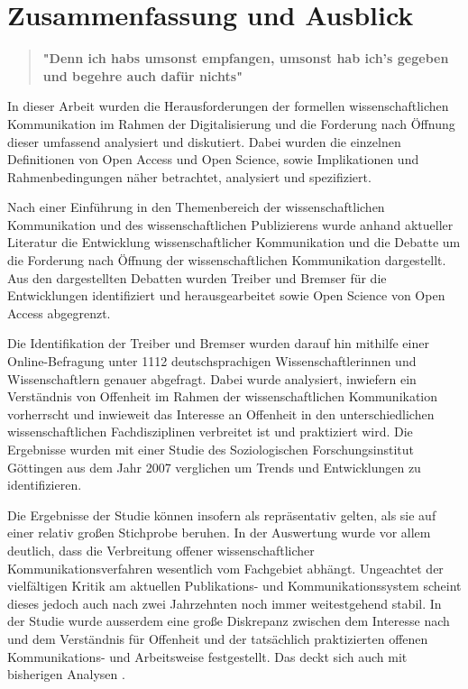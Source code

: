 \chapter{Zusammenfassung und Ausblick}

\begin{quote}
\textbf{"Denn ich habs umsonst empfangen, umsonst hab ich's gegeben und begehre auch dafür nichts"}
\end{quote} \cite{luther_1876}

In dieser Arbeit wurden die Herausforderungen der formellen wissenschaftlichen Kommunikation im Rahmen der Digitalisierung und die Forderung nach Öffnung dieser umfassend analysiert und diskutiert. Dabei wurden die einzelnen Definitionen von Open Access und Open Science, sowie Implikationen und Rahmenbedingungen näher betrachtet, analysiert und spezifiziert.

Nach einer Einführung in den Themenbereich der wissenschaftlichen Kommunikation und des wissenschaftlichen Publizierens wurde anhand aktueller Literatur die Entwicklung wissenschaftlicher Kommunikation und die Debatte um die Forderung nach Öffnung der wissenschaftlichen Kommunikation dargestellt. Aus den dargestellten Debatten wurden Treiber und Bremser für die Entwicklungen identifiziert und herausgearbeitet sowie Open Science von Open Access abgegrenzt.

Die Identifikation der Treiber und Bremser wurden darauf hin mithilfe einer Online-Befragung unter 1112 deutschsprachigen Wissenschaftlerinnen und Wissenschaftlern genauer abgefragt. Dabei wurde analysiert, inwiefern ein Verständnis von Offenheit im Rahmen der wissenschaftlichen Kommunikation vorherrscht und inwieweit das Interesse an Offenheit in den unterschiedlichen wissenschaftlichen Fachdisziplinen verbreitet ist und praktiziert wird. Die Ergebnisse wurden mit einer Studie des Soziologischen Forschungsinstitut Göttingen aus dem Jahr 2007 verglichen um Trends und Entwicklungen zu identifizieren.

Die Ergebnisse der Studie können insofern als repräsentativ gelten, als sie auf einer relativ großen Stichprobe beruhen. In der Auswertung wurde vor allem deutlich, dass die Verbreitung offener wissenschaftlicher Kommunikationsverfahren wesentlich vom Fachgebiet abhängt. Ungeachtet der vielfältigen Kritik am aktuellen Publikations- und Kommunikationssystem scheint dieses jedoch auch nach zwei Jahrzehnten noch immer weitestgehend stabil. In der Studie wurde ausserdem eine große Diskrepanz zwischen dem Interesse nach und dem Verständnis für Offenheit und der tatsächlich praktizierten offenen Kommunikations- und Arbeitsweise festgestellt. Das deckt sich auch mit bisherigen Analysen \cite{yiotis_2013_open} \cite{Bartling_2013} \cite{hagner_2015_sache_buches} \cite{Fecher_2015}.


